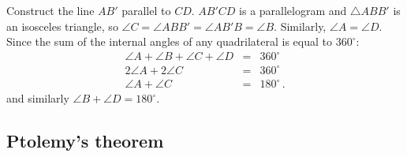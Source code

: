 \vspace{-4ex}

Construct the line $AB'$ parallel to $CD$. $AB'CD$ is a parallelogram and $\triangle ABB'$ is an isosceles triangle, so $\angle C= \angle ABB' = \angle AB'B = \angle B$. Similarly, $\angle A = \angle D$. Since the sum of the internal angles of any quadrilateral is equal to $360^\circ$:
\begin{eqnarray*}
\angle A + \angle B + \angle C + \angle D &=& 360^\circ\\
2\angle A + 2 \angle C &=& 360^\circ\\
\angle A +  \angle C &=& 180^\circ\,.
\end{eqnarray*}
and similarly $\angle B +  \angle D = 180^\circ$.

\subsection*{Ptolemy's theorem}

